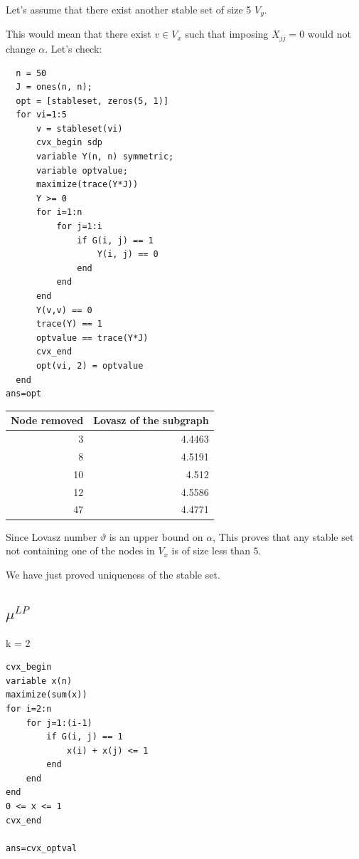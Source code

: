 \documentclass[11pt]{article}
\begin{document}
Let's assume that there exist another stable set of size 5 \(V_y\).

This would mean that there exist \(v \in V_x\) such that imposing \(X_{jj} = 0\) would not change \(\alpha\). Let's check:

\begin{verbatim}
  n = 50
  J = ones(n, n);
  opt = [stableset, zeros(5, 1)]
  for vi=1:5
      v = stableset(vi)
      cvx_begin sdp
      variable Y(n, n) symmetric;
      variable optvalue;
      maximize(trace(Y*J))
      Y >= 0
      for i=1:n
          for j=1:i
              if G(i, j) == 1
                  Y(i, j) == 0
              end
          end
      end
      Y(v,v) == 0
      trace(Y) == 1
      optvalue == trace(Y*J)
      cvx_end
      opt(vi, 2) = optvalue
  end
ans=opt
\end{verbatim}

\begin{org}
\begin{center}
\begin{tabular}{rr}
Node removed & Lovasz of the subgraph\\
\hline
3 & 4.4463\\
8 & 4.5191\\
10 & 4.512\\
12 & 4.5586\\
47 & 4.4771\\
\end{tabular}
\end{center}
\end{org}



Since Lovasz number \(\vartheta\) is an upper bound on \(\alpha\), This proves that any stable set not containing one of the nodes in \(V_x\) is of size less than \(5\).

We have just proved uniqueness of the stable set.

\subsection{\(\mu^{LP}\)}
\label{sec:orgheadline3}

k = 2

\begin{verbatim}
cvx_begin 
variable x(n)
maximize(sum(x))
for i=2:n
    for j=1:(i-1)
        if G(i, j) == 1
            x(i) + x(j) <= 1
        end
    end
end
0 <= x <= 1
cvx_end

ans=cvx_optval
\end{verbatim}
\end{document}
